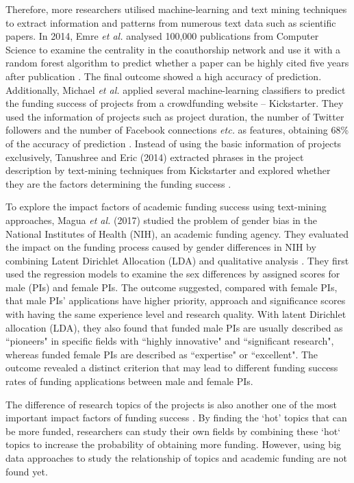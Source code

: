 Therefore, more researchers utilised machine-learning and text mining techniques to extract information and patterns from numerous text data such as scientific papers. In 2014, Emre \textit{et al.} analysed 100,000 publications from Computer Science to examine the centrality in the coauthorship network and use it with a random forest algorithm to predict whether a paper can be highly cited five years after publication \cite{sarigol2014}. The final outcome showed a high accuracy of prediction. Additionally, Michael \textit{et al.} applied several machine-learning classifiers to predict the funding success of projects from a crowdfunding website -- Kickstarter. They used the information of projects such as project duration, the number of Twitter followers and the number of Facebook connections \textit{etc.} as features, obtaining 68\% of the accuracy of prediction \cite{greenberg2013}. Instead of using the basic information of projects exclusively, Tanushree and Eric (2014) extracted phrases in the project description by text-mining techniques from Kickstarter and explored whether they are the factors determining the funding success \cite{mitra2014}.

To explore the impact factors of academic funding success using text-mining approaches, Magua \textit{et al.} (2017) studied the problem of gender bias in the National Institutes of Health (NIH), an academic funding agency. They evaluated the impact on the funding process caused by gender differences in NIH by combining Latent Dirichlet Allocation (LDA) and qualitative analysis \cite{Magua2017}. They first used the regression models to examine the sex differences by assigned scores for male (PIs) and female PIs. The outcome suggested, compared with female PIs, that male PIs' applications have higher priority, approach and significance scores with having the same experience level and research quality. With latent Dirichlet allocation (LDA), they also found that funded male PIs are usually described as ``pioneers" in specific fields with ``highly innovative" and ``significant research", whereas funded female PIs are described as ``expertise" or ``excellent". The outcome revealed a distinct criterion that may lead to different funding success rates of funding applications between male and female PIs.

The difference of research topics of the projects is also another one of the most important impact factors of funding success \cite{Alberts787}. By finding the `hot' topics that can be more funded, researchers can study their own fields by combining these `hot` topics to increase the probability of obtaining more funding. However, using big data approaches to study the relationship of topics and academic funding are not found yet.

